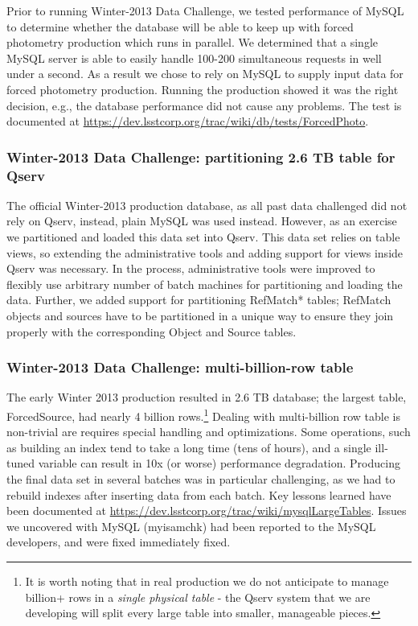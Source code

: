 \documentclass[DM,lsstdraft,toc]{lsstdoc}
\begin{document}
Prior to running Winter-2013 Data Challenge, we tested performance of
MySQL to determine whether the database will be able to keep up with
forced photometry production which runs in parallel. We determined that
a single MySQL server is able to easily handle 100-200 simultaneous
requests in well under a second. As a result we chose to rely on MySQL
to supply input data for forced photometry production. Running the
production showed it was the right decision, e.g., the database
performance did not cause any problems. The test is documented at
\url{https://dev.lsstcorp.org/trac/wiki/db/tests/ForcedPhoto}.

\subsubsection{Winter-2013 Data Challenge: partitioning 2.6 TB table for
Qserv}\label{winter-2013-data-challenge-partitioning-2.6-tb-table-for-qserv}

The official Winter-2013 production database, as all past data
challenged did not rely on Qserv, instead, plain MySQL was used instead.
However, as an exercise we partitioned and loaded this data set into
Qserv. This data set relies on table views, so extending the
administrative tools and adding support for views inside Qserv was
necessary. In the process, administrative tools were improved to
flexibly use arbitrary number of batch machines for partitioning and
loading the data. Further, we added support for partitioning RefMatch*
tables; RefMatch objects and sources have to be partitioned in a unique
way to ensure they join properly with the corresponding Object and
Source tables.

\subsubsection{Winter-2013 Data Challenge: multi-billion-row
table}\label{winter-2013-data-challenge-multi-billion-row-table}

The early Winter 2013 production resulted in 2.6 TB database; the
largest table, ForcedSource, had nearly 4 billion rows.\footnote{It is
  worth noting that in real production we do not anticipate to manage
  billion+ rows in a \emph{single physical table} - the Qserv system
  that we are developing will split every large table into smaller,
  manageable pieces.} Dealing with multi-billion row table is
non-trivial are requires special handling and optimizations. Some
operations, such as building an index tend to take a long time (tens of
hours), and a single ill-tuned variable can result in 10x (or worse)
performance degradation. Producing the final data set in several batches
was in particular challenging, as we had to rebuild indexes after
inserting data from each batch. Key lessons learned have been documented
at \url{https://dev.lsstcorp.org/trac/wiki/mysqlLargeTables}. Issues we
uncovered with MySQL (myisamchk) had been reported to the MySQL
developers, and were fixed immediately fixed.
\end{document}
